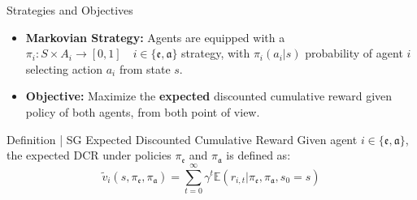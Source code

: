 \documentclass[10pt, aspectratio=169]{beamer}
\newcommand{\evidenzia}[1]{\textcolor{verdeSalvia}{\textbf{#1}}}
\begin{document}
\begin{frame}{Strategies and Objectives}
    \begin{itemize}
        \item \textbf{Markovian Strategy:} Agents are equipped with a $\pi_{i}:S\times A_{i}\rightarrow[0,1]\quad i \in \{\mathfrak{e}, \mathfrak{a}\}$ strategy, with $\pi_i(a_i|s)$ probability of agent $i$ selecting action $a_i$ from state $s$. %
        \item \textbf{Objective:} Maximize the \evidenzia{expected} discounted cumulative reward given policy of both agents, from both point of view.%
    \end{itemize}
    \vspace{0.5cm}
        \begin{block}{Definition | SG Expected Discounted Cumulative Reward}%
        Given agent $i \in \{\mathfrak{e}, \mathfrak{a}\}$, the expected DCR under policies $\pi_{\mathfrak{e}}$ and $\pi_{\mathfrak{a}}$ is defined as:
            $$
            \tilde{v}_{i}(s,\pi_{\mathfrak{e}},\pi_{\mathfrak{a}})=\sum_{t=0}^{\infty}\gamma^{t}\mathbb{E}(r_{i,t}|\pi_{\mathfrak{e}},\pi_{\mathfrak{a}},s_{0}=s) 
            $$
        \end{block}
\end{frame}
\end{document}

